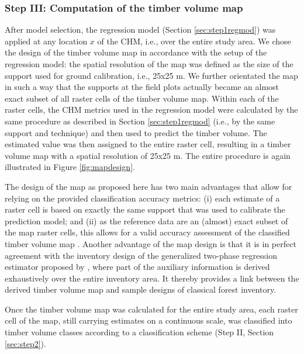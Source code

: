 \subsubsection{Step III: Computation of the timber volume map}
\label{sec:step3}

After model selection, the regression model (Section \ref{sec:step1regmod}) was applied at any location $x$ of the CHM, i.e., over the entire study area. We chose the design of the timber volume map in accordance with the setup of the regression model: the spatial resolution of the map was defined as the size of the support used for ground calibration, i.e., 25x25 m. We further orientated the map in such a way that the supports at the field plots actually became an almost exact subset of all raster cells of the timber volume map. Within each of the raster cells, the CHM metrics used in the regression model were calculated by the same procedure as described in Section \ref{sec:step1regmod} (i.e., by the same support and technique) and then used to predict the timber volume. The estimated value was then assigned to the entire raster cell, resulting in a timber volume map with a spatial resolution of 25x25 m. The entire procedure is again illustrated in Figure \ref{fig:mapdesign}.\par
The design of the map as proposed here has two main advantages that allow for relying on the provided classification accuracy metrics: (i) each estimate of a raster cell is based on exactly the same support that was used to calibrate the prediction model; and (ii) as the reference data are an (almost) exact subset of the map raster cells, this allows for a valid accuracy assessment of the classified timber volume map \citep{congalton2008}. Another advantage of the map design is that it is in perfect agreement with the inventory design of the generalized two-phase regression estimator proposed by \citet{mandallaz2013b}, where part of the auxiliary information is derived exhaustively over the entire inventory area. It thereby provides a link between the derived timber volume map and sample designs of classical forest inventory.\par
Once the timber volume map was calculated for the entire study area, each raster cell of the map, still carrying estimates on a continuous scale, was classified into timber volume classes according to a classification scheme (Step II, Section \ref{sec:step2}).

